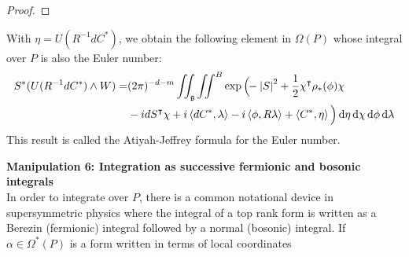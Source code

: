\begin{proof}

\end{proof}


With $\eta=U(R^{-1}dC^*)$, we obtain the following element in $\Omega(P)$ whose
integral over $P$ is also the Euler number:
\begin{align} \label{eq:AJ_formula_euler}
S^*(U(R^{-1}dC^*)\wedge W)	
= &(2\pi)^{-d-m}\iint_{\g}\iint^B 
\exp\Big(\!\!-\abs{S}^2+\frac{1}{2}\chi^{\intercal}\rho_*(\phi)\chi \\
	&- idS^\intercal \chi
	+i\gen{dC^*,\lambda}-i\gen{\phi,R\lambda} + \gen{C^*,\eta}\Big)  \odif{\eta}
	\odif{\chi} \odif{\phi}\odif{\lambda}  \nonumber 
\end{align}
This result is called the Atiyah-Jeffrey formula for the Euler number.

\vspace{1ex}\noindent
\textbf{Manipulation 6: Integration as successive fermionic and bosonic integrals} \\
In order to integrate over $P$, there is a common notational device in
supersymmetric physics where the integral of a top rank form is written as a
Berezin (fermionic) integral followed by a normal (bosonic) integral. 
If $\alpha \in \Omega^*(P)$ is a form written in terms of local coordinates  


